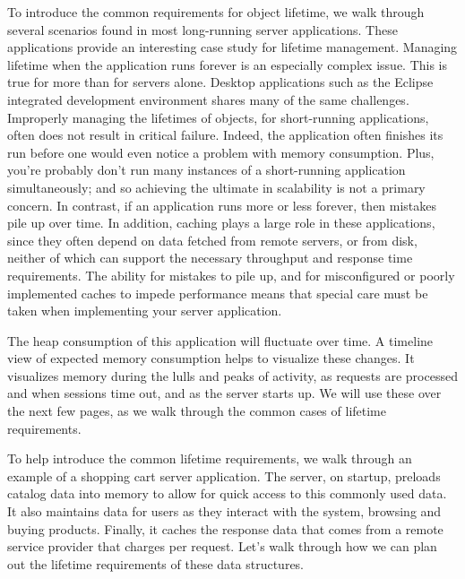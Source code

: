 To introduce the common requirements for object lifetime, we walk through several
scenarios found in most long-running server applications. These applications
provide an interesting case study for lifetime management. Managing lifetime when
the application runs forever is an especially complex issue. This is true for
more than for servers alone. Desktop applications such as the Eclipse integrated
development environment shares many of the same challenges. Improperly managing
the lifetimes of objects, for short-running applications, often does not result
in critical failure. Indeed, the application often finishes its run before one
would even notice a problem with memory consumption. Plus, you're probably don't
run many instances of a short-running application simultaneously; and so
achieving the ultimate in scalability is not a primary concern. In contrast, if
an application runs more or less forever, then mistakes pile up over time. In
addition, caching plays a large role in these applications, since they often
depend on data fetched from remote servers, or from disk, neither of which can
support the necessary throughput and response time requirements. The ability for
mistakes to pile up, and for misconfigured or poorly implemented caches to impede
performance means that special care must be taken when implementing your server application.

The heap consumption of this application will fluctuate over time. A timeline
view of expected memory consumption helps to visualize these changes. It
visualizes memory during the lulls and peaks of activity, as requests are
processed and when sessions time out, and as the server starts up. We will use
these over the next few pages, as we walk through the common cases of lifetime
requirements.




To help introduce the common lifetime requirements, we walk through an example of
a shopping cart server application. The server, on startup, preloads catalog data
into memory to allow for quick access to this commonly used data. It also
maintains data for users as they interact with the system, browsing and buying
products. Finally, it caches the response data that comes from a remote service
provider that charges per request. Let's walk through how we can plan out the
lifetime requirements of these data structures.

